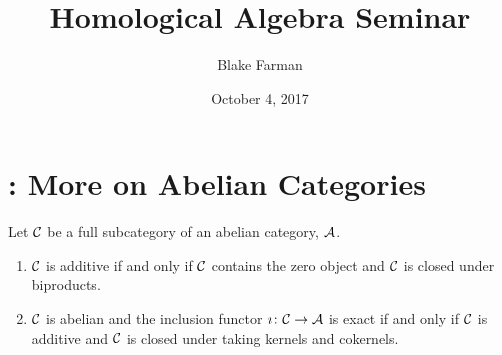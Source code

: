 \documentclass[reqno, 12pt]{amsart}
\title[Seminar]{Homological Algebra Seminar}
\author{Blake Farman}
\date{October 4, 2017}
\begin{document}
\maketitle

\section{\cite[Section 1.6]{Weibel95}: More on Abelian Categories}
\begin{lemma}
  Let $\mathcal{C}$ be a full subcategory of an abelian category, $\mathcal{A}$.
  \begin{enumerate}
  \item
    $\mathcal{C}$ is additive if and only if $\mathcal{C}$ contains the zero object and $\mathcal{C}$ is closed under biproducts.
  \item
    $\mathcal{C}$ is abelian and the inclusion functor $\imath \colon \mathcal{C} \to \mathcal{A}$ is exact if and only if $\mathcal{C}$ is additive and $\mathcal{C}$ is closed under taking kernels and cokernels.
  \end{enumerate}
\end{lemma}
\end{document}
